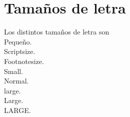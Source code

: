 \documentclass[10pt,a4paper]{article}
\begin{document}
\section{Tamaños de letra}
Los distintos tamaños de letra son \\
{\tiny Pequeño.} \\
{\scriptsize Scriptsize.} \\
{\footnotesize Footnotesize.} \\
{\small Small.} \\
{\normalsize Normal.} \\
{\large large.} \\
{\Large Large.} \\
{\LARGE LARGE.} \\
\end{document}
